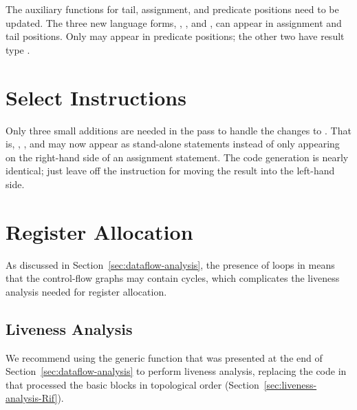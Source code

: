 \documentclass[11pt]{book}
\begin{document}
The auxiliary functions for tail, assignment, and predicate positions
need to be updated. The three new language forms, ,
, and , can appear in assignment and tail
positions.  Only  may appear in predicate positions; the
other two have result type .

\section{Select Instructions}
\label{sec:select-instructions-loop}

Only three small additions are needed in the
 pass to handle the changes to \LangCLoop{}.  That
is, , , and  may now appear as
stand-alone statements instead of only appearing on the right-hand
side of an assignment statement. The code generation is nearly
identical; just leave off the instruction for moving the result into
the left-hand side.

\section{Register Allocation}
\label{sec:register-allocation-loop}

As discussed in Section~\ref{sec:dataflow-analysis}, the presence of
loops in \LangLoop{} means that the control-flow graphs may contain cycles,
which complicates the liveness analysis needed for register
allocation.

\subsection{Liveness Analysis}
\label{sec:liveness-analysis-r8}

We recommend using the generic  function that
was presented at the end of Section~\ref{sec:dataflow-analysis} to
perform liveness analysis, replacing the code in
 that processed the basic blocks in topological
order (Section~\ref{sec:liveness-analysis-Rif}).
\end{document}
